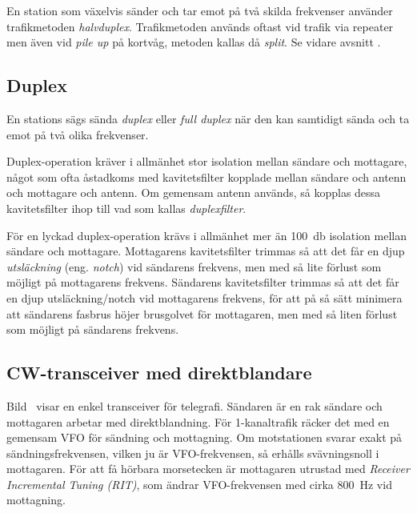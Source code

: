 En station som växelvis sänder och tar emot på två skilda frekvenser använder
trafikmetoden \emph{halvduplex}.
Trafikmetoden används oftast vid trafik via repeater men även vid \emph{pile up}
på kortvåg, metoden kallas då \emph{split}.
Se vidare avsnitt .

\subsection{Duplex}
\label{duplex}

En stations sägs sända \emph{duplex} eller \emph{full duplex} när den kan
samtidigt sända och ta emot på två olika frekvenser.

Duplex-operation kräver i allmänhet stor isolation mellan sändare och mottagare,
något som ofta åstadkoms med kavitetsfilter kopplade mellan sändare och antenn
och mottagare och antenn.
Om gemensam antenn används, så kopplas dessa kavitetsfilter ihop till vad som
kallas \emph{duplexfilter}.

För en lyckad duplex-operation krävs i allmänhet mer än \qty{100}{\decibel}
isolation mellan sändare och mottagare.
Mottagarens kavitetsfilter trimmas så att det får en djup \emph{utsläckning}
(eng. \emph{notch}) vid sändarens frekvens, men med så lite förlust som möjligt
på mottagarens frekvens.
Sändarens kavitetsfilter trimmas så att det får en djup utsläckning/notch vid
mottagarens frekvens, för att på så sätt minimera att sändarens fasbrus höjer
brusgolvet för mottagaren, men med så liten förlust som möjligt på sändarens
frekvens.

\subsection{CW-transceiver med direktblandare}

Bild~ visar en enkel transceiver för telegrafi.
Sändaren är en rak sändare och mottagaren arbetar med direktblandning.
För 1-kanaltrafik räcker det med en gemensam VFO för sändning och mottagning.
Om motstationen svarar exakt på sändningsfrekvensen, vilken ju är
VFO-frekvensen, så erhålls svävningsnoll i mottagaren.
För att få hörbara morsetecken är mottagaren utrustad med
\emph{Receiver Incremental Tuning (RIT)}, som ändrar VFO-frekvensen med
cirka \qty{800}{\hertz} vid mottagning.

